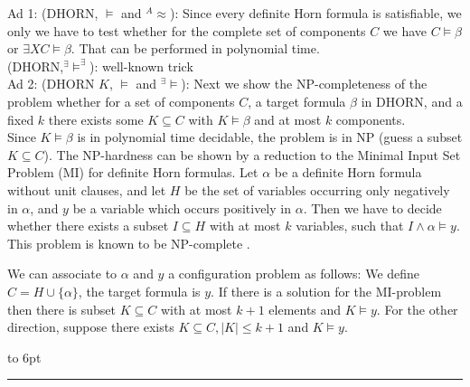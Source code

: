 \documentclass[12pt]{article}
\newcommand{\AM}{\mbox{$^\exists\!\!\models$}}
\newcommand{\AMB}{\mbox{$^\exists\!\!\models^\exists$}}
\newcommand{\AEQ}{\mbox{$^A$\hspace{-0.5mm}$\approx$}}
\newenvironment{proof}{\parindent=0pt{\bf Proof: }}{
   \hspace*{\fill}\hbox to 6pt{\leaders\hrule width 6pt height 6pt\hfill}\par}
\begin{document}
\begin{proof}
Ad 1: (DHORN, $\models$ and \AEQ): Since every definite Horn formula is satisfiable, we only we have to test whether for the complete set of components $C$ we have $C \models \beta$ or $\exists X C \models \beta$. That can be performed in polynomial time.\\

(DHORN,\AMB): well-known trick\\

Ad 2: (DHORN $K$, $\models$ and \AM): Next we show the NP-completeness of the problem whether for a set of components $C$, a target formula $\beta$ in DHORN, and a fixed $k$ there exists some $K \subseteq C$ with $K \models \beta$ and at most $k$ components.\\
Since $K \models \beta$ is in polynomial time decidable, the problem is in NP (guess a subset $K \subseteq C$).
The NP-hardness can be shown by a reduction to the Minimal Input Set Problem (MI) for definite Horn formulas.
Let $\alpha$ be a definite Horn formula without unit clauses, and let $H$ be the set of variables occurring only
negatively in $\alpha$, and $y$ be a variable which occurs positively in $\alpha$. Then we have to decide whether
there exists a subset $I \subseteq H$ with at most $k$ variables, such that $I \wedge \alpha \models y$. This problem is known to be NP-complete \cite{mi}.

We can associate to $\alpha$ and $y$ a configuration problem as follows: We define $C = H \cup \{\alpha\}$, the target
formula is $y$. If there is a solution for the MI-problem then there is subset $K \subseteq C$ with at most $k+1$ elements
and $K \models y$. For the other direction, suppose there exists $K \subseteq C, |K | \leq k+1$ and $K \models y$.
\end{proof}
\end{document}
